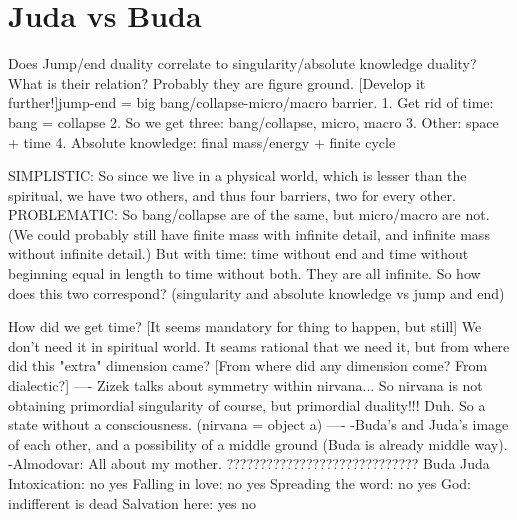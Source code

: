 \documentclass[10pt]{book}
\begin{document}
\chapter{Juda vs Buda}

Does Jump/end duality correlate to singularity/absolute knowledge duality? What is their relation? Probably they are figure ground. [Develop it further!]jump-end = big bang/collapse-micro/macro barrier.
1. Get rid of time: bang = collapse
2. So we get three: bang/collapse, micro, macro
3. Other: space + time
4. Absolute knowledge: final mass/energy + finite cycle

SIMPLISTIC:
So since we live in a physical world, which is lesser than the spiritual, we have two others, and thus four barriers, two for every other.
PROBLEMATIC:
So bang/collapse are of the same, but micro/macro are not. (We could probably still have finite mass with infinite detail, and infinite mass without infinite detail.) But with time: time without end and time without beginning equal in length to time without both. They are all infinite.
So how does this two correspond? (singularity and absolute knowledge vs jump and end)

How did we get time? [It seems mandatory for thing to happen, but still] We don't need it in spiritual world. It seams rational that we need it, but from where did this "extra" dimension came? [From where did any dimension come? From dialectic?] 
----
Zizek talks about symmetry within nirvana... So nirvana is not obtaining primordial singularity of course, but primordial duality!!! Duh. So a state without a consciousness. (nirvana = object a)
----
-Buda's and Juda's image of each other, and a possibility of a middle ground (Buda is already middle way).
-Almodovar: All about my mother.
?????????????????????????????
					Buda		Juda
Intoxication:		no			yes
Falling in love:	no			yes
Spreading the word: no			yes
God:				indifferent	is dead
Salvation here:		yes			no
\end{document}
